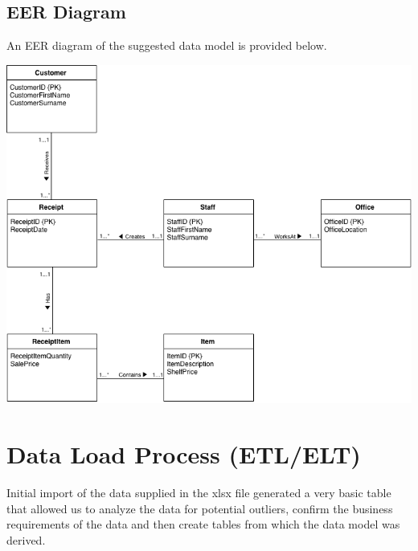 \documentclass{article}
\begin{document}
\newpage

        \subsection{EER Diagram}
            An EER diagram of the suggested data model is provided below. 

            \bigskip

            \begin{center}
                \includegraphics[width=\textwidth-40pt,keepaspectratio]{Images/A2-EERModel.png}
            \end{center}


\newpage

    \section{Data Load Process (ETL/ELT)}
    \label{sec:ETL}
        Initial import of the data supplied in the xlsx file generated a very basic table
        that allowed us to analyze the data for potential outliers, confirm the business
        requirements of the data and then create tables from which the data model was derived.
        \\
        
\end{document}
